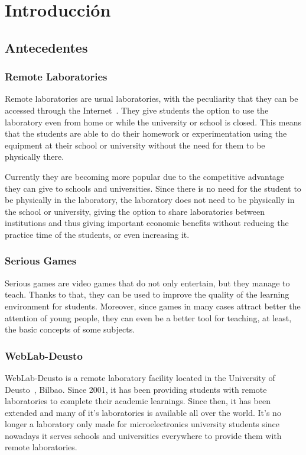 \chapter{Introducción}

\section{Antecedentes}


\subsection{Remote Laboratories}

Remote laboratories are usual laboratories, with the peculiarity that they can be accessed through
the Internet~\cite{remote_labs}. They give students the option to use the laboratory even from home
or while the university or school is closed. This means that the students are able to do their
homework or experimentation using the equipment at their school or university without the need for
them to be physically there.

Currently they are becoming more popular due to the competitive advantage they can give to schools
and universities. Since there is no need for the student to be physically in the laboratory, the
laboratory does not need to be physically in the school or university, giving the option to share
laboratories between institutions and thus giving important economic benefits without reducing
the practice time of the students, or even increasing it.

\subsection{Serious Games}

Serious games are video games that do not only entertain, but they manage to teach. Thanks to that,
they can be used to improve the quality of the learning environment for students. Moreover, since
games in many cases attract better the attention of young people, they can even be a better tool for
teaching, at least, the basic concepts of some subjects.

\subsection{WebLab-Deusto}

WebLab-Deusto is a remote laboratory facility located in the University of Deusto~\cite{weblab},
Bilbao. Since 2001, it has been providing students with remote laboratories to complete their
academic learnings. Since then, it has been extended and many of it's laboratories is available
all over the world. It's no longer a laboratory only made for microelectronics university students
since nowadays it serves schools and universities everywhere to provide them with remote
laboratories.

